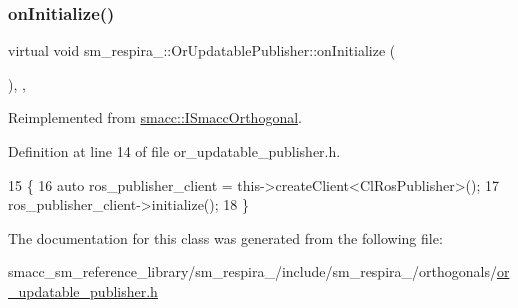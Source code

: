 \subsubsection{\texorpdfstring{on\+Initialize()}{onInitialize()}}
{\footnotesize\ttfamily virtual void sm\+\_\+respira\+\_\+::\+Or\+Updatable\+Publisher\+::on\+Initialize (\begin{DoxyParamCaption}{ }\end{DoxyParamCaption})\hspace{0.3cm}{\ttfamily [inline]}, {\ttfamily [override]}, {\ttfamily [virtual]}}



Reimplemented from \hyperlink{classsmacc_1_1ISmaccOrthogonal_a6bb31c620cb64dd7b8417f8705c79c7a}{smacc\+::\+I\+Smacc\+Orthogonal}.



Definition at line 14 of file or\+\_\+updatable\+\_\+publisher.\+h.


\begin{DoxyCode}
15     \{
16         \textcolor{keyword}{auto} ros\_publisher\_client = this->createClient<ClRosPublisher>();
17         ros\_publisher\_client->initialize();
18     \}
\end{DoxyCode}


The documentation for this class was generated from the following file\+:\begin{DoxyCompactItemize}
\item 
smacc\+\_\+sm\+\_\+reference\+\_\+library/sm\+\_\+respira\+\_/include/sm\+\_\+respira\+\_/orthogonals/\hyperlink{sm__respira__1_2include_2sm__respira__1_2orthogonals_2or__updatable__publisher_8h}{or\+\_\+updatable\+\_\+publisher.\+h}\end{DoxyCompactItemize}
